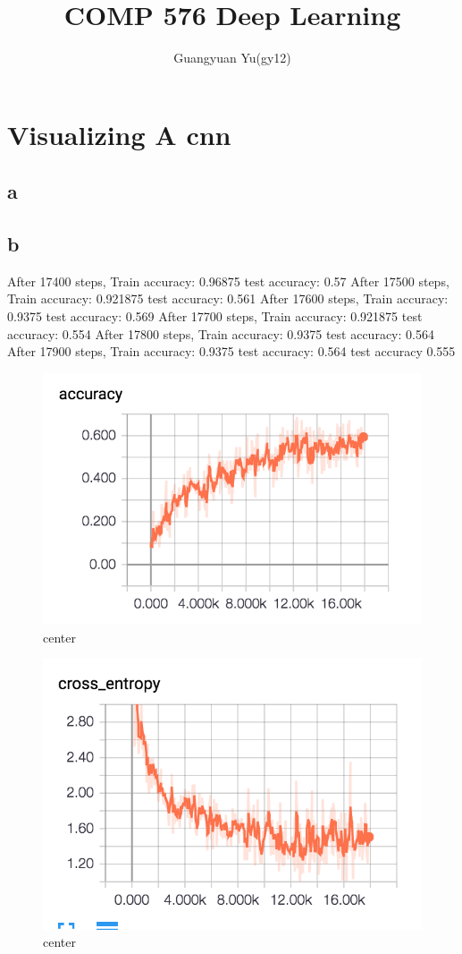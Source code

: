 \documentclass[12pt]{article}
\title{COMP 576 Deep Learning}
\author{Guangyuan Yu(gy12)}
\begin{document}
\maketitle

\section{Visualizing A cnn}

\subsection{a}
\subsection{b}
After 17400 steps, Train accuracy: 0.96875
test accuracy: 0.57
After 17500 steps, Train accuracy: 0.921875
test accuracy: 0.561
After 17600 steps, Train accuracy: 0.9375
test accuracy: 0.569
After 17700 steps, Train accuracy: 0.921875
test accuracy: 0.554
After 17800 steps, Train accuracy: 0.9375
test accuracy: 0.564
After 17900 steps, Train accuracy: 0.9375
test accuracy: 0.564
test accuracy 0.555
\begin{figure}[H]
  \caption{center}
  \centering
    \includegraphics[scale=1]{train.png}
\end{figure}
\begin{figure}[H]
  \caption{center}
  \centering
    \includegraphics[scale=1]{cross.png}
\end{figure}
\end{document}
